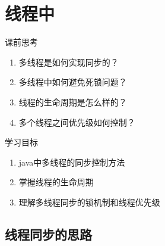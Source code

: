 \chapter{线程中}
课前思考
\begin{enumerate}
	\item 多线程是如何实现同步的？
	\item 多线程中如何避免死锁问题？
	\item 线程的生命周期是怎么样的？
	\item 多个线程之间优先级如何控制？
\end{enumerate}
学习目标
\begin{enumerate}
	\item java中多线程的同步控制方法
	\item 掌握线程的生命周期
	\item 理解多线程同步的锁机制和线程优先级
\end{enumerate}
\section{线程同步的思路}
